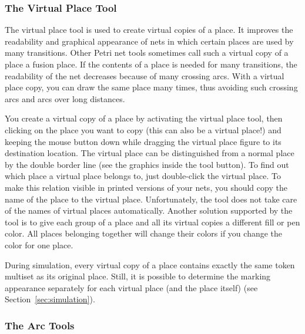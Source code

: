 \subsubsection{The Virtual Place Tool}

The virtual place tool is used to create virtual copies of a place.
It improves
the readability and graphical appearance of nets in which
certain places are used by many transitions.
Other Petri net tools sometimes call such a virtual copy of a place
a fusion place. If the contents of a place is needed for many
transitions, the readability of the net decreases because of
many crossing arcs. With a virtual place copy, you can draw the
same place many times, thus avoiding such crossing arcs and arcs
over long distances.

You create a virtual copy of a place by activating the virtual
place tool, then clicking on the place you want to copy (this
can also be a virtual place!) and
keeping the mouse button down while dragging the virtual place
figure to its destination location. The virtual place can be
distinguished from a normal place by the double border line
(see the graphics inside the tool button).
To find out which place a virtual place belongs to, just
double-click the virtual place.
To make this relation visible in printed versions of your nets,
you should copy the name of the place to the virtual place.
Unfortunately, the tool does not take care of the names of
virtual places automatically.
Another solution supported by the tool is to give
each group of a place and all its virtual copies a different
fill or pen color. All places belonging together
will change their colors if you change the color for
one place.

During simulation, every virtual copy of a place contains exactly
the same token multiset as its original place.
Still, it is possible to determine the marking appearance separately
for each virtual place (and the place itself)
(see Section~\ref{sec:simulation}).


\subsubsection{The Arc Tools}
\label{subsubsec:toolArc}

